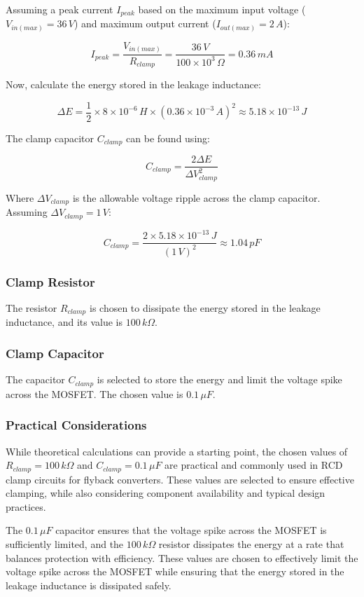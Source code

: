 \documentclass{article}
\begin{document}
Assuming a peak current \( I_{peak} \) based on the maximum input voltage (\( V_{in(max)} = 36 \, V \)) and maximum output current (\( I_{out(max)} = 2 \, A \)):

\[
I_{peak} = \frac{V_{in(max)}}{R_{clamp}} = \frac{36 \, V}{100 \times 10^3 \, \Omega} = 0.36 \, mA
\]

Now, calculate the energy stored in the leakage inductance:

\[
\Delta E = \frac{1}{2} \times 8 \times 10^{-6} \, H \times (0.36 \times 10^{-3} \, A)^2 \approx 5.18 \times 10^{-13} \, J
\]

The clamp capacitor \( C_{clamp} \) can be found using:

\[
C_{clamp} = \frac{2 \Delta E}{\Delta V_{clamp}^2}
\]

Where \( \Delta V_{clamp} \) is the allowable voltage ripple across the clamp capacitor. Assuming \( \Delta V_{clamp} = 1 \, V \):

\[
C_{clamp} = \frac{2 \times 5.18 \times 10^{-13} \, J}{(1 \, V)^2} \approx 1.04 \, pF
\]
\subsubsection{Clamp Resistor}
The resistor \( R_{clamp} \) is chosen to dissipate the energy stored in the leakage inductance, and its value is \( 100 \, k\Omega \).

\subsubsection{Clamp Capacitor}
The capacitor \( C_{clamp} \) is selected to store the energy and limit the voltage spike across the MOSFET. The chosen value is \( 0.1 \, \mu F \).

\subsubsection{Practical Considerations}
While theoretical calculations can provide a starting point, the chosen values of \( R_{clamp} = 100 \, k\Omega \) and \( C_{clamp} = 0.1 \, \mu F \) are practical and commonly used in RCD clamp circuits for flyback converters. These values are selected to ensure effective clamping, while also considering component availability and typical design practices.

The \( 0.1 \, \mu F \) capacitor ensures that the voltage spike across the MOSFET is sufficiently limited, and the \( 100 \, k\Omega \) resistor dissipates the energy at a rate that balances protection with efficiency.
These values are chosen to effectively limit the voltage spike across the MOSFET while ensuring that the energy stored in the leakage inductance is dissipated safely.
\end{document}
